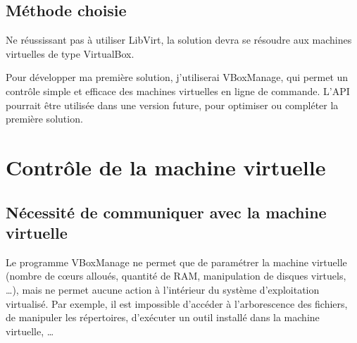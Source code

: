 
\subsection{Méthode choisie}

Ne réussissant pas à utiliser LibVirt, la solution devra se résoudre aux machines virtuelles de type VirtualBox.

Pour développer ma première solution, j'utiliserai VBoxManage, qui permet un contrôle simple et efficace des machines virtuelles en ligne de commande.
L'API pourrait être utilisée dans une version future, pour optimiser ou compléter la première solution.
\\






\section{Contrôle de la machine virtuelle}
\label{Contrôle de la machine virtuelle}


\subsection{Nécessité de communiquer avec la machine virtuelle}

Le programme VBoxManage ne permet que de paramétrer la machine virtuelle (nombre de cœurs alloués, quantité de RAM, manipulation de disques virtuels, \ldots), mais ne permet aucune action à l'intérieur du système d'exploitation virtualisé.
Par exemple, il est impossible d'accéder à l'arborescence des fichiers, de manipuler les répertoires, d'exécuter un outil installé dans la machine virtuelle, \ldots
\\




